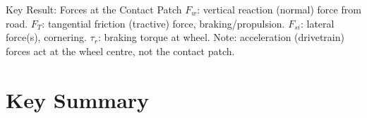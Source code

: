 \documentclass[10pt,a4paper]{article}
\begin{document}
\begin{varlist}
\end{varlist}

\begin{keybox}{Key Result: Forces at the Contact Patch}
$F_w$: vertical reaction (normal) force from road. $F_T$: tangential friction (tractive) force, braking/propulsion. $F_{si}$: lateral force(s), cornering. $\tau_r$: braking torque at wheel. Note: acceleration (drivetrain) forces act at the wheel centre, not the contact patch.
\end{keybox}

\section{Key Summary}
\end{document}
